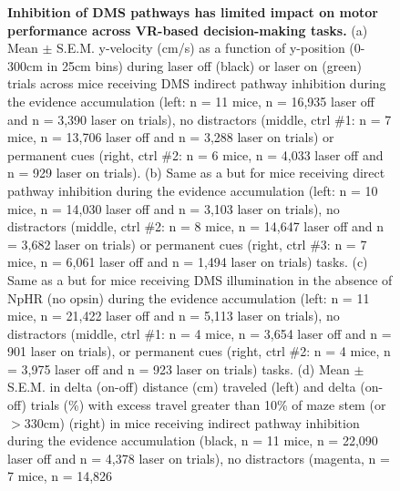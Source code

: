 \begin{figure}[t!]
\begin{center}
    \caption[Inhibition of DMS pathways has limited impact on motor performance across VR-based decision-making tasks]{\textbf{Inhibition of DMS pathways has limited impact on motor performance across VR-based decision-making tasks.} (a) Mean $\pm$ S.E.M. y-velocity (cm/s) as a function of y-position (0- 300cm in 25cm bins) during laser off (black) or laser on (green) trials across mice receiving DMS indirect pathway inhibition during the evidence accumulation (left: n = 11 mice, n = 16,935 laser off and n = 3,390 laser on trials), no distractors (middle, ctrl \#1:  n = 7 mice, n = 13,706 laser off and n = 3,288 laser on trials) or permanent cues (right, ctrl \#2:  n = 6 mice, n = 4,033 laser off and n = 929 laser on trials). (b) Same as a but for mice receiving direct pathway inhibition during the evidence accumulation (left: n = 10 mice, n = 14,030 laser off and n = 3,103 laser on trials), no distractors (middle, ctrl \#2: n = 8 mice, n = 14,647 laser off and n = 3,682 laser on trials) or permanent cues (right, ctrl \#3:  n = 7 mice, n = 6,061 laser off and n = 1,494 laser on trials) tasks. (c) Same as a but for mice receiving DMS illumination in the absence of NpHR (no opsin) during the evidence accumulation (left: n = 11 mice, n = 21,422 laser off and n = 5,113 laser on trials), no distractors (middle, ctrl \#1:  n = 4 mice, n = 3,654 laser off and n = 901 laser on trials), or permanent cues (right, ctrl \#2:  n = 4 mice, n = 3,975 laser off and n = 923 laser on trials) tasks. (d) Mean $\pm$ S.E.M. in delta (on-off) distance (cm) traveled (left) and delta (on-off) trials (\%) with excess travel greater than 10\% of maze stem (or $>$330cm) (right) in mice receiving indirect pathway inhibition during the evidence accumulation (black, n = 11 mice, n = 22,090 laser off and n = 4,378 laser on trials), no distractors (magenta,  n = 7 mice, n = 14,826 }
    \label{fig:ap1:ext6}
  \end{center}
\end{figure}
